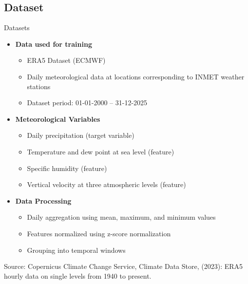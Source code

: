 \documentclass[aspectratio=169]{beamer}
\begin{document}
\subsection{Dataset}
\begin{frame}{Datasets}

\begin{itemize}

    \item \textbf{Data used for training}
    \begin{itemize}
        \item ERA5 Dataset (ECMWF)
        \item Daily meteorological data at locations corresponding to INMET weather stations
        \item Dataset period: 01-01-2000 -- 31-12-2025
    \end{itemize}
    \pause

    \vspace{0.3cm}

    \item \textbf{Meteorological Variables}
    \begin{itemize}
        \item Daily precipitation (target variable)
        \item Temperature and dew point at sea level (feature)
        \item Specific humidity (feature)
        \item Vertical velocity at three atmospheric levels (feature)
    \end{itemize}
    \pause

    \vspace{0.3cm}

    \item \textbf{Data Processing}
    \begin{itemize}
        \item Daily aggregation using mean, maximum, and minimum values
        \item Features normalized using z-score normalization
        \item Grouping into temporal windows
    \end{itemize}

\end{itemize}
\vfill
{\scriptsize Source: Copernicus Climate Change Service, Climate Data Store, (2023): ERA5 hourly data on single levels from 1940 to present.}

\end{frame}
\end{document}
